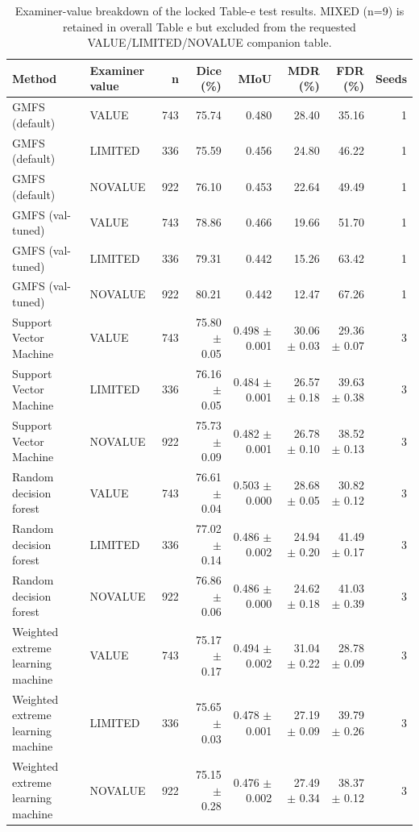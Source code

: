 \begin{table}[t]
\centering
\scriptsize
\setlength{\tabcolsep}{3pt}
\caption{Examiner-value breakdown of the locked Table-e test results. MIXED (n=9) is retained in overall Table e but excluded from the requested VALUE/LIMITED/NOVALUE companion table.}
\label{tab:sd302e-value}
\begin{tabular}{llrrrrrr}
\toprule
Method & Examiner value & n & Dice (\%) & MIoU & MDR (\%) & FDR (\%) & Seeds \\
\midrule
GMFS (default) & VALUE & 743 & 75.74 & 0.480 & 28.40 & 35.16 & 1 \\
GMFS (default) & LIMITED & 336 & 75.59 & 0.456 & 24.80 & 46.22 & 1 \\
GMFS (default) & NOVALUE & 922 & 76.10 & 0.453 & 22.64 & 49.49 & 1 \\
GMFS (val-tuned) & VALUE & 743 & 78.86 & 0.466 & 19.66 & 51.70 & 1 \\
GMFS (val-tuned) & LIMITED & 336 & 79.31 & 0.442 & 15.26 & 63.42 & 1 \\
GMFS (val-tuned) & NOVALUE & 922 & 80.21 & 0.442 & 12.47 & 67.26 & 1 \\
Support Vector Machine & VALUE & 743 & 75.80 $\pm$ 0.05 & 0.498 $\pm$ 0.001 & 30.06 $\pm$ 0.03 & 29.36 $\pm$ 0.07 & 3 \\
Support Vector Machine & LIMITED & 336 & 76.16 $\pm$ 0.05 & 0.484 $\pm$ 0.001 & 26.57 $\pm$ 0.18 & 39.63 $\pm$ 0.38 & 3 \\
Support Vector Machine & NOVALUE & 922 & 75.73 $\pm$ 0.09 & 0.482 $\pm$ 0.001 & 26.78 $\pm$ 0.10 & 38.52 $\pm$ 0.13 & 3 \\
Random decision forest & VALUE & 743 & 76.61 $\pm$ 0.04 & 0.503 $\pm$ 0.000 & 28.68 $\pm$ 0.05 & 30.82 $\pm$ 0.12 & 3 \\
Random decision forest & LIMITED & 336 & 77.02 $\pm$ 0.14 & 0.486 $\pm$ 0.002 & 24.94 $\pm$ 0.20 & 41.49 $\pm$ 0.17 & 3 \\
Random decision forest & NOVALUE & 922 & 76.86 $\pm$ 0.06 & 0.486 $\pm$ 0.000 & 24.62 $\pm$ 0.18 & 41.03 $\pm$ 0.39 & 3 \\
Weighted extreme learning machine & VALUE & 743 & 75.17 $\pm$ 0.17 & 0.494 $\pm$ 0.002 & 31.04 $\pm$ 0.22 & 28.78 $\pm$ 0.09 & 3 \\
Weighted extreme learning machine & LIMITED & 336 & 75.65 $\pm$ 0.03 & 0.478 $\pm$ 0.001 & 27.19 $\pm$ 0.09 & 39.79 $\pm$ 0.26 & 3 \\
Weighted extreme learning machine & NOVALUE & 922 & 75.15 $\pm$ 0.28 & 0.476 $\pm$ 0.002 & 27.49 $\pm$ 0.34 & 38.37 $\pm$ 0.12 & 3 \\

\end{tabular}
\end{table}
